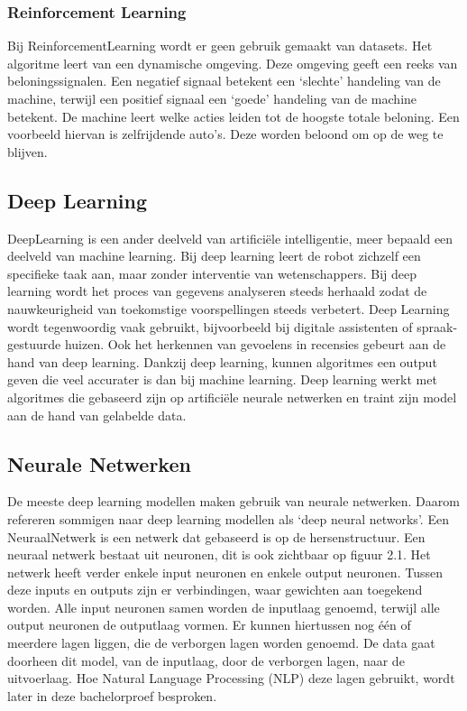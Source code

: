 \subsubsection{Reinforcement Learning}
\label{sec:reinforcementlearning}
Bij \gls{ReinforcementLearning} wordt er geen gebruik gemaakt van datasets. Het algoritme leert van een dynamische omgeving. Deze omgeving geeft een reeks van beloningssignalen. Een negatief signaal betekent een ‘slechte’ handeling van de machine, terwijl een positief signaal een ‘goede’ handeling van de machine betekent. De machine leert welke acties leiden tot de hoogste totale beloning. \autocite{Lievens2020} Een voorbeeld hiervan is zelfrijdende auto’s. Deze worden beloond om op de weg te blijven.
 
\subsection{Deep Learning}
\label{sec:deeplearning}
\gls{DeepLearning} is een ander deelveld van artificiële intelligentie, meer bepaald een deelveld van machine learning. Bij deep learning leert de robot zichzelf een specifieke taak aan, maar zonder interventie van wetenschappers. \autocite{IBM2020} Bij deep learning wordt het proces van gegevens analyseren steeds herhaald zodat de nauwkeurigheid van toekomstige voorspellingen steeds verbetert. Deep Learning wordt tegenwoordig vaak gebruikt, bijvoorbeeld bij digitale assistenten of spraak-gestuurde huizen. \autocite{IBM2020}
Ook het herkennen van gevoelens in recensies gebeurt aan de hand van deep learning. 
Dankzij deep learning, kunnen algoritmes een output geven die veel accurater is dan bij machine learning. Deep learning werkt met algoritmes die gebaseerd zijn op artificiële neurale netwerken en traint zijn model aan de hand van gelabelde data.


\subsection{Neurale Netwerken}
\label{sec:neuralnetworks}

De meeste deep learning modellen maken gebruik van neurale netwerken. Daarom refereren sommigen naar deep learning modellen als ‘deep neural networks’. 
Een \gls{NeuraalNetwerk} is een netwerk dat gebaseerd is op de hersenstructuur. Een neuraal netwerk bestaat uit neuronen, dit is ook zichtbaar op figuur 2.1. Het netwerk heeft verder enkele input neuronen en enkele output neuronen. Tussen deze inputs en outputs zijn er verbindingen, waar gewichten aan toegekend worden. Alle input neuronen samen worden de inputlaag genoemd, terwijl alle output neuronen de outputlaag vormen. Er kunnen hiertussen nog één of meerdere lagen liggen, die de verborgen lagen worden genoemd. De data gaat doorheen dit model, van de inputlaag, door de verborgen lagen, naar de uitvoerlaag. Hoe Natural Language Processing (NLP) deze lagen gebruikt, wordt later in deze bachelorproef besproken. \autocite{Vervoort2017}

